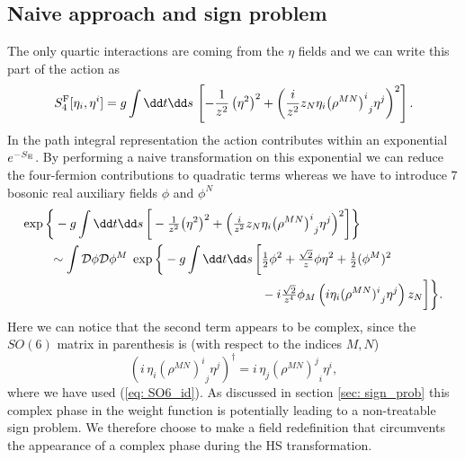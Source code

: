 \subsection{Naive approach and sign problem}
The only quartic interactions are coming from the $\eta$ fields and we can write this part of the action as
%
%
\begin{equation}
S^{\rm F}_{4} [\eta_{i},\eta^{i}] = g \int \dd t \dd s \, \left[-\frac{1}{z^{2}}\left(\eta^{2}\right)^{2} + \left(\frac{i}{z^{2}}z_{N}
\eta_{i}{\left(\rho^{MN}\right)^{i}}_{j}\eta^{j}\right)^{2} \right].
\label{eqq: S_4}
\end{equation}
%
%
In the path integral representation the  action contributes within an exponential $e^{-S_{\rm E}}$. By performing a naive  transformation on this exponential we can reduce the four-fermion contributions to quadratic  terms whereas we have to introduce 7 bosonic real auxiliary fields $\phi$ and $\phi^{N}$
%
%
\begin{align}
\exp \bigg\lbrace -g \int \dd t \dd s \, \bigg[-\tfrac{1}{z^{2}} \big(\eta^{2}\big)^{2} + \Big(\tfrac{i}{z^{2}}z_{N}
& \eta_{i}{\big(\rho^{MN}\big)^{i}}_{j}\eta^{j}\Big)^{2} \bigg] \bigg\rbrace \\
%
%
\sim \int \mathcal{D}\phi \mathcal{D}\phi^{M}\; \exp\bigg\lbrace -g \int \dd t \dd s \, \bigg[ &\tfrac{1}{2}\phi^{2} + \tfrac{\sqrt{2}}{z}\phi\eta^{2} +\tfrac{1}{2} (\phi^{M})^{2} \notag \\
 &- i\tfrac{\sqrt{2}}{z^{4}} \phi_{M} \left( i\eta_{i}{(\rho^{MN})^{i}}_{j}\eta^{j}\right) z_{N} \bigg] \bigg\rbrace. \notag
\end{align}
%
%
Here we can notice that the second term appears to be complex, since the $SO(6)$ matrix in parenthesis is  (with respect to the indices $M,N$)
%
%
\begin{equation}
\left( i \,\eta_{i} {\left(\rho^{MN}\right)^{i}}_{j}\eta^{j}\right)^{\dagger} = i\, \eta_{j} {\left(\rho^{MN}\right)^{j}}_{i}\eta^{i},
\end{equation}
%
%
where we have used (\ref{eq: SO6_id}). As discussed in section \ref{sec: sign_prob} this complex phase in the weight function is potentially leading to a non-treatable sign problem. We therefore choose to make a field redefinition that circumvents the appearance of a complex phase during the HS transformation.
%
%
%
%
%
%
